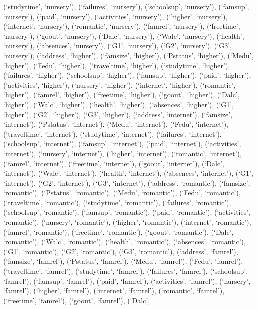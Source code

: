 \documentclass[
]{article}
\begin{document}
(`studytime', `nursery'), (`failures', `nursery'), (`schoolsup',
`nursery'), (`famsup', `nursery'), (`paid', `nursery'), (`activities',
`nursery'), (`higher', `nursery'), (`internet', `nursery'), (`romantic',
`nursery'), (`famrel', `nursery'), (`freetime', `nursery'), (`goout',
`nursery'), (`Dalc', `nursery'), (`Walc', `nursery'), (`health',
`nursery'), (`absences', `nursery'), (`G1', `nursery'), (`G2',
`nursery'), (`G3', `nursery'), (`address', `higher'), (`famsize',
`higher'), (`Pstatus', `higher'), (`Medu', `higher'), (`Fedu',
`higher'), (`traveltime', `higher'), (`studytime', `higher'),
(`failures', `higher'), (`schoolsup', `higher'), (`famsup', `higher'),
(`paid', `higher'), (`activities', `higher'), (`nursery', `higher'),
(`internet', `higher'), (`romantic', `higher'), (`famrel', `higher'),
(`freetime', `higher'), (`goout', `higher'), (`Dalc', `higher'),
(`Walc', `higher'), (`health', `higher'), (`absences', `higher'), (`G1',
`higher'), (`G2', `higher'), (`G3', `higher'), (`address', `internet'),
(`famsize', `internet'), (`Pstatus', `internet'), (`Medu', `internet'),
(`Fedu', `internet'), (`traveltime', `internet'), (`studytime',
`internet'), (`failures', `internet'), (`schoolsup', `internet'),
(`famsup', `internet'), (`paid', `internet'), (`activities',
`internet'), (`nursery', `internet'), (`higher', `internet'),
(`romantic', `internet'), (`famrel', `internet'), (`freetime',
`internet'), (`goout', `internet'), (`Dalc', `internet'), (`Walc',
`internet'), (`health', `internet'), (`absences', `internet'), (`G1',
`internet'), (`G2', `internet'), (`G3', `internet'), (`address',
`romantic'), (`famsize', `romantic'), (`Pstatus', `romantic'), (`Medu',
`romantic'), (`Fedu', `romantic'), (`traveltime', `romantic'),
(`studytime', `romantic'), (`failures', `romantic'), (`schoolsup',
`romantic'), (`famsup', `romantic'), (`paid', `romantic'),
(`activities', `romantic'), (`nursery', `romantic'), (`higher',
`romantic'), (`internet', `romantic'), (`famrel', `romantic'),
(`freetime', `romantic'), (`goout', `romantic'), (`Dalc', `romantic'),
(`Walc', `romantic'), (`health', `romantic'), (`absences', `romantic'),
(`G1', `romantic'), (`G2', `romantic'), (`G3', `romantic'), (`address',
`famrel'), (`famsize', `famrel'), (`Pstatus', `famrel'), (`Medu',
`famrel'), (`Fedu', `famrel'), (`traveltime', `famrel'), (`studytime',
`famrel'), (`failures', `famrel'), (`schoolsup', `famrel'), (`famsup',
`famrel'), (`paid', `famrel'), (`activities', `famrel'), (`nursery',
`famrel'), (`higher', `famrel'), (`internet', `famrel'), (`romantic',
`famrel'), (`freetime', `famrel'), (`goout', `famrel'), (`Dalc',
\end{document}
